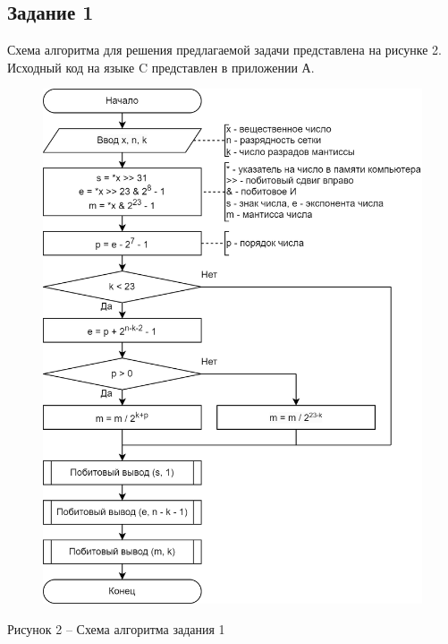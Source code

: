 \documentclass[a4paper,14pt]{extarticle}
\begin{document}
  \pagebreak
  \subsection*{Задание 1}
  Схема алгоритма для решения предлагаемой задачи представлена на рисунке 2. Исходный код на языке C представлен в приложении А.
  \begin{figure}[h]
    \centering
    \includegraphics[width=0.65\linewidth]{schemes/s-1}
  \end{figure}
  \begin{center}
    Рисунок 2 – Схема алгоритма задания 1
  \end{center}

  \pagebreak
\end{document}
